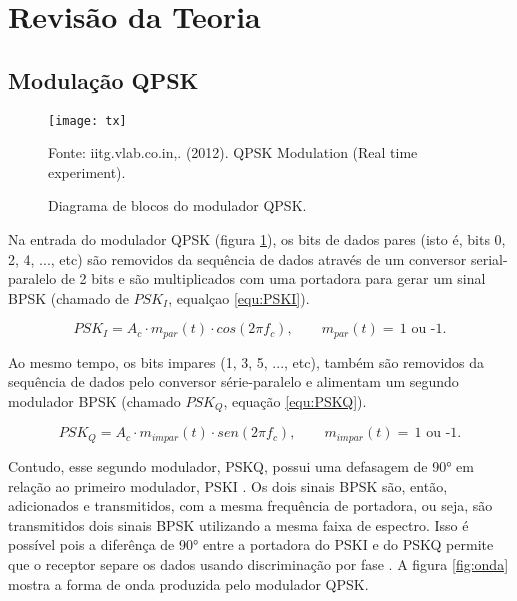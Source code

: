 \newpage
\section{Revisão da Teoria}

\subsection{Modulação QPSK}

\begin{figure}[H]
  \centering
  \caption{Diagrama de blocos do modulador QPSK.}
  \texttt{[image: tx]}
  
  \small Fonte: iitg.vlab.co.in,. (2012). QPSK Modulation (Real time experiment).
  \label{fig:tx}
\end{figure}

Na entrada do modulador QPSK (figura \ref{fig:tx}), os bits de dados pares (isto é, bits 0, 2, 4, ..., etc) são removidos da sequência de dados através de um conversor serial-paralelo de 2 bits \cite{Couch} e são multiplicados com uma portadora para gerar um sinal BPSK (chamado de $PSK_I$, equalçao \ref{equ:PSKI}). 

\begin{equation}
  \label{equ:PSKI}
  PSK_I = A_c\cdot m_{par}(t) \cdot cos \left(2\pi f_c\right), \qquad m_{par}(t) = \, \mbox{1 ou -1.}
\end{equation}

Ao mesmo tempo, os bits impares (1, 3, 5, ..., etc), também são removidos da sequência de dados pelo conversor série-paralelo e alimentam um segundo modulador BPSK (chamado $PSK_Q$, equação \ref{equ:PSKQ}). 

\begin{equation}
  \label{equ:PSKQ}
  PSK_Q = A_c\cdot m_{impar}(t) \cdot sen \left(2\pi f_c\right), \qquad m_{impar}(t) = \, \mbox{1 ou -1.}
\end{equation}

Contudo, esse segundo modulador, PSKQ, possui uma defasagem de 90° em relação ao primeiro modulador, PSKI \cite{Carlson,Proakis}. Os dois sinais BPSK são, então, adicionados e transmitidos, com a mesma frequência de portadora, ou seja, são transmitidos dois sinais BPSK utilizando a mesma faixa de espectro. Isso é possível pois a diferênça de 90° entre a portadora do PSKI e do PSKQ permite que o receptor separe os dados usando discriminação por fase \cite{Lathi}. A figura \ref{fig:onda} mostra a forma de onda produzida pelo modulador QPSK.

